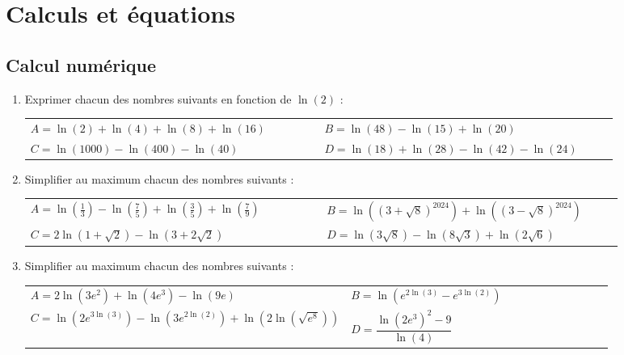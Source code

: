 \documentclass[oneside,12pt]{article}          %
\begin{document}
\section{Calculs et équations}

\subsection{Calcul numérique} 

\begin{enumerate}
	\item Exprimer chacun des nombres suivants en fonction de $\ln(2)$ :\\
	\renewcommand{\arraystretch}{2}
	\begin{tabular}{p{0.45\linewidth}p{0.45\linewidth}}
		$A=\ln(2)+\ln(4)+\ln(8)+\ln(16)$ & $B=\ln(48)-\ln(15)+\ln(20)$\\
		$C=\ln(1000)-\ln(400)-\ln(40)$ & $D=\ln(18)+\ln(28)-\ln(42)-\ln(24)$	\\
	\end{tabular}	
	
	\item Simplifier au maximum chacun des nombres suivants :\\
	\renewcommand{\arraystretch}{2}
	\begin{tabular}{p{0.45\linewidth}p{0.45\linewidth}}
		$A=\ln\left(\frac{1}{3}\right)-\ln\left(\frac{7}{5}\right)+\ln\left(\frac{3}{5}\right)+\ln\left(\frac{7}{9}\right)$ &
		$B=\ln\left((3+\sqrt{8})^{2024}\right)+\ln\left((3-\sqrt{8})^{2024}\right)$ \\
		$C=2\ln\left(1+\sqrt{2}\right)-\ln\left(3+2\sqrt{2}\right)$
		& $D=\ln(3\sqrt{8})-\ln(8\sqrt{3})+\ln(2\sqrt{6})$
	\end{tabular}

	\item Simplifier au maximum chacun des nombres suivants :\\
	\renewcommand{\arraystretch}{2}
	\begin{tabular}{p{0.55\linewidth}p{0.45\linewidth}}
		$A=2\ln\left(3e^2\right)+\ln\left(4e^3\right)-\ln(9e)$ &
		$B=\ln\left(e^{2\ln(3)}-e^{3\ln(2)}\right)$ \\
		$C=\ln\left(2e^{3\ln(3)}\right)-\ln\left(3e^{2\ln(2)}\right)+\ln\left(2\ln\left(\sqrt{e^8}\right)\right)$ &
		$D=\dfrac{\ln\left(2e^3\right)^2-9}{\ln(4)}$
	\end{tabular}
\end{enumerate}
\end{document}
